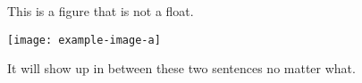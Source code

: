 \documentclass{article}
\begin{document}
This is a figure that is not a float.
\begin{center}
\texttt{[image: example-image-a]}
\end{center}
It will show up in between these two sentences no matter what.
\end{document}
